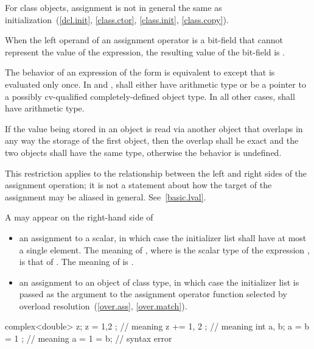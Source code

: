 \pnum
\begin{note}
For class objects, assignment is not in general the same as
initialization~(\ref{dcl.init}, \ref{class.ctor}, \ref{class.init}, \ref{class.copy}).
\end{note}

\pnum
{}%
When the left operand of an assignment operator
is a bit-field that cannot represent the value of the expression, the
resulting value of the bit-field is
.

\pnum
The behavior of an expression of the form 
is equivalent to  except
that  is evaluated only once. In \tcode{+=} and \tcode{-=},
 shall either have arithmetic type or be a pointer to a
possibly cv-qualified completely-defined object type. In all other
cases,  shall have arithmetic type.

\pnum
If the value being stored in an object is read via another object that
overlaps in any way the storage of the first object, then the overlap shall be
exact and the two objects shall have the same type, otherwise the behavior is
undefined. \begin{note} This restriction applies to the relationship
between the left and right sides of the assignment operation; it is not a
statement about how the target of the assignment may be aliased in general.
See~\ref{basic.lval}. \end{note}

\pnum
A  may appear on the right-hand side of
\begin{itemize}
\item an assignment to a scalar, in which case the initializer list shall have
at most a single element. The meaning of , where  is the
scalar type of the expression , is that of . The meaning of
 is .

\item an assignment to an object of class type, in which case the initializer
list is passed as the argument to the assignment operator function selected by
overload resolution~(\ref{over.ass}, \ref{over.match}).
\end{itemize}
\begin{example}
\begin{codeblock}
complex<double> z;
z = { 1,2 };              // meaning 
z += { 1, 2 };            // meaning 
int a, b;
a = b = { 1 };            // meaning 
a = { 1 } = b;            // syntax error
\end{codeblock}
\end{example}

